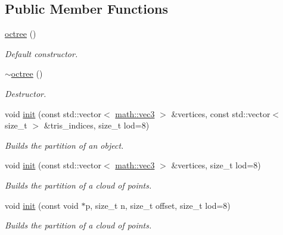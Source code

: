 \subsection*{Public Member Functions}
\begin{DoxyCompactItemize}
\item 
\mbox{\label{classphysim_1_1structures_1_1octree_ae8f02259c6494f8529542ae3bbd8e89f}} 
\hyperlink{classphysim_1_1structures_1_1octree_ae8f02259c6494f8529542ae3bbd8e89f}{octree} ()
\begin{DoxyCompactList}\small\item\em Default constructor. \end{DoxyCompactList}\item 
\mbox{\label{classphysim_1_1structures_1_1octree_a827e35f372995bf2906ab42da5d67a78}} 
\hyperlink{classphysim_1_1structures_1_1octree_a827e35f372995bf2906ab42da5d67a78}{$\sim$octree} ()
\begin{DoxyCompactList}\small\item\em Destructor. \end{DoxyCompactList}\item 
void \hyperlink{classphysim_1_1structures_1_1octree_add00dd5e93158b3fb54a7c8e37f01e8f}{init} (const std\+::vector$<$ \hyperlink{structphysim_1_1math_1_1vec3}{math\+::vec3} $>$ \&vertices, const std\+::vector$<$ size\+\_\+t $>$ \&tris\+\_\+indices, size\+\_\+t lod=8)
\begin{DoxyCompactList}\small\item\em Builds the partition of an object. \end{DoxyCompactList}\item 
void \hyperlink{classphysim_1_1structures_1_1octree_a6b6f4eb568f298f92f2c25025c60a2e2}{init} (const std\+::vector$<$ \hyperlink{structphysim_1_1math_1_1vec3}{math\+::vec3} $>$ \&vertices, size\+\_\+t lod=8)
\begin{DoxyCompactList}\small\item\em Builds the partition of a cloud of points. \end{DoxyCompactList}\item 
void \hyperlink{classphysim_1_1structures_1_1octree_a193143baa82a028ca9f7c65d69b48246}{init} (const void $\ast$p, size\+\_\+t n, size\+\_\+t offset, size\+\_\+t lod=8)
\begin{DoxyCompactList}\small\item\em Builds the partition of a cloud of points. \end{DoxyCompactList}\item 

\end{DoxyCompactItemize}
